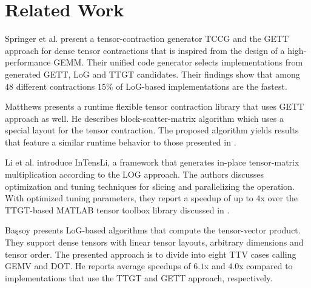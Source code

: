 \section{Related Work}
\label{sec:related}

\begin{comment}
The authors in \cite{dinapoli:2014:towards.efficient.use} discuss the efficient tensor contractions with highly optimized BLAS. 
Based on the LoG approach, they define requirements for the use of \tf{gemm} for class 3 tensor contractions and provide slicing techniques for tensors. %
The slicing recipe for the class 2 categorized tensor contractions contains a short description with a rule of thumb for maximizing performance.
Runtime measurements cover class 3 tensor contractions.
\end{comment}

Springer et al. \cite{springer:2018:design} present a tensor-contraction generator TCCG and the GETT approach for dense tensor contractions that is inspired from the design of a high-performance GEMM.
Their unified code generator selects implementations from generated GETT, LoG and TTGT candidates.
Their findings show that among $48$ different contractions $15$\% of LoG-based implementations are the fastest.

Matthews \cite{matthews:2018:high} presents a runtime flexible tensor contraction library that uses GETT approach as well.
He describes block-scatter-matrix algorithm which uses a special layout for the tensor contraction.
The proposed algorithm yields results that feature a similar runtime behavior to those presented in \cite{springer:2018:design}.

Li et al. \cite{li:2015:input} introduce InTensLi, a framework that generates in-place tensor-matrix multiplication according to the LOG approach. 
The authors discusses optimization and tuning techniques for slicing and parallelizing the operation.
With optimized tuning parameters, they report a speedup of up to $4$x over the TTGT-based MATLAB tensor toolbox library discussed in \cite{bader:2006:algorithm862}.

Ba\c{s}soy \cite{bassoy:2019:ttv} presents LoG-based algorithms that compute the tensor-vector product. 
They support dense tensors with linear tensor layouts, arbitrary dimensions and tensor order.
The presented approach is to divide into eight TTV cases calling GEMV and DOT.
He reports average speedups of $6.1$x and $4.0$x compared to implementations that use the TTGT and GETT approach, respectively.

